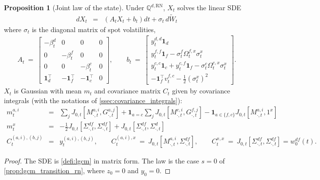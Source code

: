 \documentclass[11pt,english]{amsart}
\newcommand{\vun}{\mathbf{1}}
\newcommand{\RN}{\mathrm{RN}}
\newcommand{\QQ}{\mathbb{Q}}
\theoremstyle{definition}
\newtheorem{prop}{Proposition}
\begin{document}
\begin{prop}[Joint law of the state]\label{prop:lgcm_joint_law}
Under $\QQ^{d,\RN}$, $X_t$ solves the linear SDE
\begin{eqnarray}
  dX_t &=& \left( A_t X_t + b_t \right) dt + \sigma_t \, d\widetilde{W}_t
\end{eqnarray}
where $\sigma_t$ is the diagonal matrix of spot volatilities,
\begin{eqnarray*}
  A_t ~=~ \begin{bmatrix} -\beta^d_t & 0 & 0 & 0 \\ 0 & -\beta^f_t & 0 & 0 \\ 0 & 0 & -\beta^c_t & 0 \\ \vun^\top_d & -\vun^\top_f & -\vun^\top_c & 0 \end{bmatrix} , \qquad
  b_t ~=~ \begin{bmatrix} y^{d,d}_t\vun_d \\ y^{f,f}_t\vun_f - \sigma^f_t\Omega^{f,x}_t\sigma^x_t \\ y^{c,c}_t\vun_c + y^{c,f}_t\vun_f - \sigma^c_t\Omega^{c,x}_t\sigma^x_t \\ -\vun^\top_f v^{f,c}_t - \frac{1}{2}(\sigma^x_t)^2 \end{bmatrix} .
\end{eqnarray*}
$X_t$ is Gaussian with mean $m_t$ and covariance matrix $C_t$ given by covariance integrals (with the notations of \autoref{ssec:covariance_integrals}):
\begin{eqnarray*}
  m^{a,i}_t &=& \sum_{j} J_{0,t}[M^{a,i}_{\cdot,t}, G^{a,j}_{\cdot,t}] + \mathbf{1}_{a=c}\sum_{j} J_{0,t}[M^{c,i}_{\cdot,t}, G^{f,j}_{\cdot,t}] - \mathbf{1}_{a\in\{f,c\}} J_{0,t}[M^{a,i}_{\cdot,t}, 1^x] \\
  m^x_t &=& - \frac{1}{2}J_{0,t}[\Sigma^{df}_{\cdot,t},\Sigma^{df}_{\cdot,t}] + J_{0,t}[\Sigma^{df}_{\cdot,t},\Sigma^{d}_{\cdot,t}] \\
  C^{(a,i),(b,j)}_t &=& y^{(a,i),(b,j)}_t , \qquad
  C^{(a,i),x}_t ~=~ J_{0,t}[M^{a,i}_{\cdot,t},\Sigma^{df}_{\cdot,t}] , \qquad
  C^{x,x}_t ~=~ J_{0,t}[\Sigma^{df}_{\cdot,t},\Sigma^{df}_{\cdot,t}] = w^{df}_0(t) .
\end{eqnarray*}
\end{prop}

\begin{proof}
The SDE is \autoref{defi:lgcm} in matrix form. The law is the case $s=0$ of \autoref{prop:lgcm_transition_rn}, where $z_0 = 0$ and $y_0 = 0$.
\end{proof}
\end{document}
